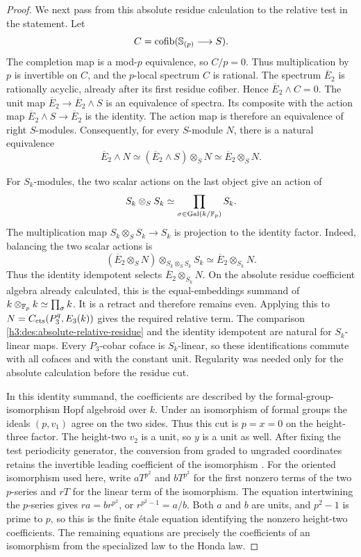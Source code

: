 \begin{proof}
We next pass from this absolute residue calculation to the
relative test in the statement.  Let
\[
 C=\operatorname{cofib}(\mathbb S_{(p)}\longrightarrow S).
\]
The completion map is a mod-\(p\) equivalence, so \(C/p=0\).
Thus multiplication by \(p\) is invertible on \(C\), and the
\(p\)-local spectrum \(C\) is rational.  The spectrum
\(\overline E_2\) is rationally acyclic, already after its
first residue cofiber.  Hence \(\overline E_2\wedge C=0\).
The unit map \(\overline E_2\to\overline E_2\wedge S\) is
an equivalence of spectra.  Its composite with the action map
\(\overline E_2\wedge S\to\overline E_2\) is the identity.
The action map is therefore an equivalence of right
\(S\)-modules.  Consequently, for every
\(S\)-module \(N\), there is a natural equivalence
\begin{equation}\label{h3:des:absolute-relative-residue}
 \overline E_2\wedge N
 \simeq(\overline E_2\wedge S)\otimes_S N
 \simeq\overline E_2\otimes_S N.
\end{equation}

For \(S_k\)-modules, the two scalar actions on the last
object give an action of
\[
 S_k\otimes_S S_k
       \simeq\prod_{\sigma\in\operatorname{Gal}(k/\mathbb F_p)}S_k.
\]
The multiplication map \(S_k\otimes_S S_k\to S_k\) is projection
to the identity factor.  Indeed, balancing the two scalar actions is
\[
 (\overline E_2\otimes_S N)
   \otimes_{S_k\otimes_S S_k}S_k
 \simeq \overline E_2\otimes_{S_k}N.
\]
Thus the identity idempotent selects
\(\overline E_2\otimes_{S_k}N\).  On the absolute
residue coefficient algebra already calculated, this is the
equal-embeddings summand of
\(k\otimes_{\mathbb F_p}k\simeq\prod_\sigma k\).
It is a retract and therefore remains even.  Applying this
to \(N=C_{\mathrm{cts}}(P_3^q,E_3(k))\) gives the required relative
term.  The comparison \eqref{h3:des:absolute-relative-residue}
and the identity idempotent are natural for \(S_k\)-linear
maps.  Every \(P_3\)-cobar coface is \(S_k\)-linear,
so these identifications commute with all cofaces and
with the constant unit.  Regularity was needed only for
the absolute calculation before the residue cut.

In this identity summand, the coefficients are described
by the formal-group-isomorphism Hopf algebroid over \(k\).
Under an isomorphism of formal groups the ideals
\((p,v_1)\) agree on the two sides.  Thus this cut is \(p=x=0\)
on the height-three factor.  The height-two \(v_2\) is a unit,
so \(y\) is a unit as well.  After fixing the test periodicity generator,
the conversion from graded to ungraded coordinates retains the invertible
leading coefficient of the isomorphism
\cite[(2.10)--(2.11) and (2.15)--(2.16), pp.~7--9]{BhattacharyaEgger2019}.
For the oriented isomorphism used here, write
\(aT^{p^2}\) and \(bT^{p^2}\) for the first nonzero terms of the
two \(p\)-series and \(rT\) for the linear term of the isomorphism.
The equation intertwining the \(p\)-series gives
\(ra=br^{p^2}\), or \(r^{p^2-1}=a/b\).  Both \(a\) and \(b\) are units,
and \(p^2-1\) is prime to \(p\), so this is the finite étale equation
identifying the nonzero height-two coefficients.  The remaining equations
are precisely the coefficients of an isomorphism from the specialized
law to the Honda law.


\end{proof}
